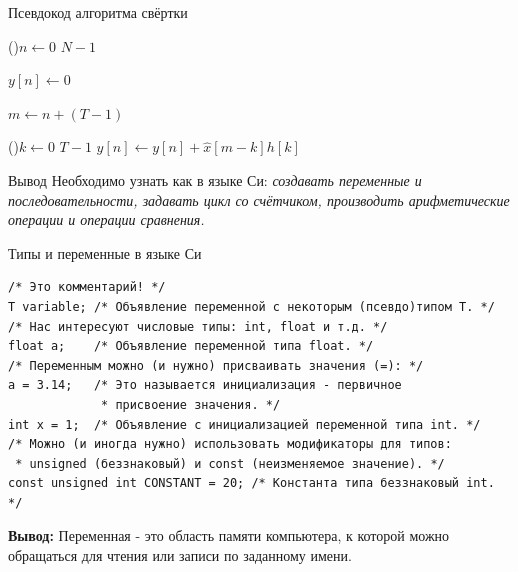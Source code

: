 \documentclass{beamer}
\begin{document}
    \begin{frame}{Псевдокод алгоритма свёртки}
        \begin{algorithm}[H]
            \BlankLine
            \For(){$n \leftarrow 0$ \KwTo $N - 1$} 
            {
                $y[n] \leftarrow 0$ 
                \par
                $m \leftarrow n + (T - 1)$ 
                \par
                \For(){$k\leftarrow 0$ \KwTo $T - 1$}
                {
                    $y[n] \leftarrow y[n] + \hat x[m - k]h[k]$ 
                }
            }
        \end{algorithm}
        \par
        \begin{block}{Вывод}
            Необходимо узнать как в языке Си: {\it создавать переменные и последовательности, задавать цикл со счётчиком, производить арифметические операции и операции сравнения.}
        \end{block}
    \end{frame}
    \begin{frame}[fragile]{Типы и переменные в языке Си} 
        \begin{verbatim}
/* Это комментарий! */
T variable; /* Объявление переменной с некоторым (псевдо)типом T. */
/* Нас интересуют числовые типы: int, float и т.д. */
float a;    /* Объявление переменной типа float. */
/* Переменным можно (и нужно) присваивать значения (=): */
a = 3.14;   /* Это называется инициализация - первичное 
             * присвоение значения. */
int x = 1;  /* Объявление с инициализацией переменной типа int. */
/* Можно (и иногда нужно) использовать модификаторы для типов: 
 * unsigned (беззнаковый) и const (неизменяемое значение). */
const unsigned int CONSTANT = 20; /* Константа типа беззнаковый int. */
        \end{verbatim}
        \par
        \justifying
        {\bf Вывод:} Переменная - это область памяти компьютера, к которой можно обращаться для чтения или записи по заданному имени. 
    \end{frame}
\end{document}
